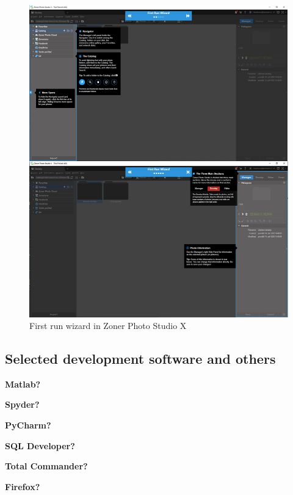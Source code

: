 \documentclass[a4paper,10pt,twoside]{article}
\begin{document}
\vspace{0.3cm}
\begin{figure}[hbt!] 
\begin{center}
\includegraphics[width=15cm]{pictures/zoner.png} 
\caption[First run wizard in Zoner Photo Studio X]{First run wizard in Zoner Photo Studio X}
\label{fig:zoner}
\end{center}
\end{figure}

\subsection{Selected development software and others}

\noindent \textbf{Matlab?}

\noindent \textbf{Spyder?}

\noindent \textbf{PyCharm?}

\noindent \textbf{SQL Developer?}

\noindent \textbf{Total Commander?}

\noindent \textbf{Firefox?}
\end{document}
